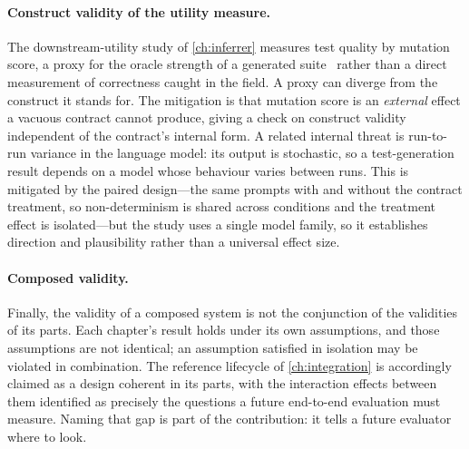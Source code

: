 \paragraph{Construct validity of the utility measure.} The downstream-utility study
of \cref{ch:inferrer} measures test quality by mutation score, a proxy for the
oracle strength of a generated suite~\citep{barr2015oracle} rather than a direct
measurement of correctness caught in the field. A proxy can diverge from the
construct it stands for. The mitigation is that mutation score is an \emph{external}
effect a vacuous contract cannot produce, giving a check on construct validity
independent of the contract's internal form. A related internal threat is
run-to-run variance in the language model: its output is stochastic, so a
test-generation result depends on a model whose behaviour varies between runs. This
is mitigated by the paired design---the same prompts with and without the contract
treatment, so non-determinism is shared across conditions and the treatment effect
is isolated---but the study uses a single model family, so it establishes direction
and plausibility rather than a universal effect size.

\paragraph{Composed validity.} Finally, the validity of a composed system is not the
conjunction of the validities of its parts. Each chapter's result holds under its own
assumptions, and those assumptions are not identical; an assumption satisfied in
isolation may be violated in combination. The reference lifecycle of
\cref{ch:integration} is accordingly claimed as a design coherent in its parts, with
the interaction effects between them identified as precisely the questions a future
end-to-end evaluation must measure. Naming that gap is part of the contribution: it
tells a future evaluator where to look.
